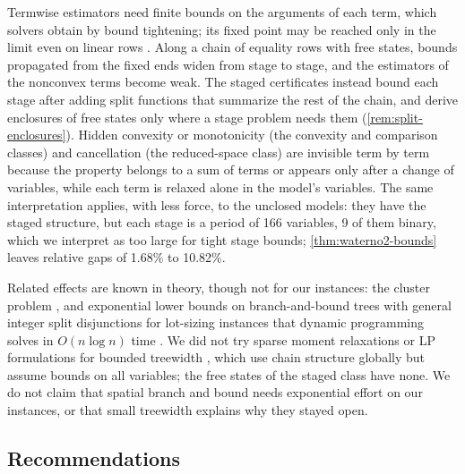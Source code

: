 \label{sec:interpretation-reading}Termwise estimators need finite bounds on the arguments of each term, which solvers obtain by bound tightening; its fixed point may be reached only in the limit even on linear rows \citep{belotti2012-on-feasibility-based-bounds-tightening}.
Along a chain of equality rows with free states, bounds propagated from the fixed ends widen from stage to stage, and the estimators of the nonconvex terms become weak.
The staged certificates instead bound each stage after adding split functions that summarize the rest of the chain, and derive enclosures of free states only where a stage problem needs them (\cref{rem:split-enclosures}).
Hidden convexity or monotonicity (the convexity and comparison classes) and cancellation (the reduced-space class) are invisible term by term because the property belongs to a sum of terms or appears only after a change of variables, while each term is relaxed alone in the model's variables.
The same interpretation applies, with less force, to the unclosed  models: they have the staged structure, but each stage is a period of 166 variables, 9 of them binary, which we interpret as too large for tight stage bounds; \cref{thm:waterno2-bounds} leaves relative gaps of 1.68\% to 10.82\%.

Related effects are known in theory, though not for our instances: the cluster problem \citep{wechsung2014-the-cluster-problem-revisited,kannan2017-the-cluster-problem-in-constrained}, and exponential lower bounds on branch-and-bound trees with general integer split disjunctions for lot-sizing instances that dynamic programming solves in $O(n\log n)$ time \citep{dey2022-lower-bound-on-size-of}.
We did not try sparse moment relaxations \citep{lasserre2006-convergent-sdprelaxations-in-polynomial-optimization} or LP formulations for bounded treewidth \citep{bienstock2018-lp-formulations-for-polynomial-optimization}, which use chain structure globally but assume bounds on all variables; the free states of the staged class have none.
We do not claim that spatial branch and bound needs exponential effort on our instances, or that small treewidth explains why they stayed open.

\subsection{Recommendations}\label{sec:conclusion-recs}

